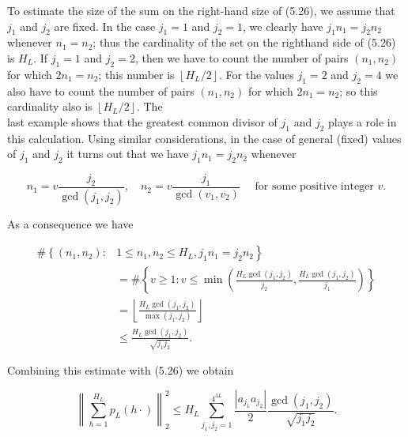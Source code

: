 \documentclass[10pt]{article}
\begin{document}
To estimate the size of the sum on the right-hand size of (5.26), we assume that $j_{1}$ and $j_{2}$ are fixed. In the case $j_{1}=1$ and $j_{2}=1$, we clearly have $j_{1} n_{1}=j_{2} n_{2}$ whenever $n_{1}=n_{2}$; thus the cardinality of the set on the righthand side of (5.26) is $H_{L}$. If $j_{1}=1$ and $j_{2}=2$, then we have to count the number of pairs $\left(n_{1}, n_{2}\right)$ for which $2 n_{1}=n_{2}$; this number is $\left\lfloor H_{L} / 2\right\rfloor$. For the values $j_{1}=2$ and $j_{2}=4$ we also have to count the number of pairs $\left(n_{1}, n_{2}\right)$ for which $2 n_{1}=n_{2}$; so this cardinality also is $\left\lfloor H_{L} / 2\right\rfloor$. The\\
last example shows that the greatest common divisor of $j_{1}$ and $j_{2}$ plays a role in this calculation. Using similar considerations, in the case of general (fixed) values of $j_{1}$ and $j_{2}$ it turns out that we have $j_{1} n_{1}=j_{2} n_{2}$ whenever

$$
n_{1}=v \frac{j_{2}}{\operatorname{gcd}\left(j_{1}, j_{2}\right)}, \quad n_{2}=v \frac{j_{1}}{\operatorname{gcd}\left(v_{1}, v_{2}\right)} \quad \text { for some positive integer } v .
$$

As a consequence we have

$$
\begin{aligned}
\#\left\{\left(n_{1}, n_{2}\right):\right. & \left.1 \leqslant n_{1}, n_{2} \leqslant H_{L}, j_{1} n_{1}=j_{2} n_{2}\right\} \\
& =\#\left\{v \geqslant 1: v \leqslant \min \left(\frac{H_{L} \operatorname{gcd}\left(j_{1}, j_{2}\right)}{j_{2}}, \frac{H_{L} \operatorname{gcd}\left(j_{1}, j_{2}\right)}{j_{1}}\right)\right\} \\
& =\left\lfloor\frac{H_{L} \operatorname{gcd}\left(j_{1}, j_{2}\right)}{\max \left(j_{1}, j_{2}\right)}\right\rfloor \\
& \leqslant \frac{H_{L} \operatorname{gcd}\left(j_{1}, j_{2}\right)}{\sqrt{j_{1} j_{2}}} .
\end{aligned}
$$

Combining this estimate with (5.26) we obtain


\begin{equation*}
\left\|\sum_{h=1}^{H_{L}} p_{L}(h \cdot)\right\|_{2}^{2} \leqslant H_{L} \sum_{j_{1}, j_{2}=1}^{4^{3 L}} \frac{\left|a_{j_{1}} a_{j_{2}}\right|}{2} \frac{\operatorname{gcd}\left(j_{1}, j_{2}\right)}{\sqrt{j_{1} j_{2}}} . \tag{5.27}
\end{equation*}
\end{document}
